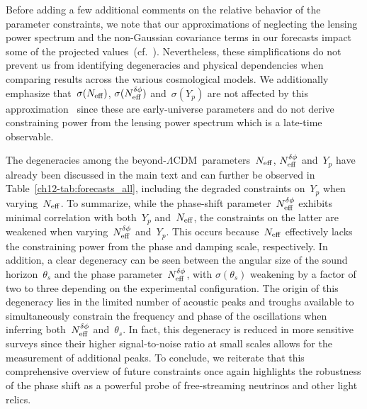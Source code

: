 \begin{subappendices}
Before adding a few additional comments on the relative behavior of the parameter constraints, we note that our approximations of neglecting the lensing power spectrum and the non-Gaussian covariance terms in our forecasts impact some of the projected values~(cf.~\cite{Green:2016cjr}). Nevertheless, these simplifications do not prevent us from identifying degeneracies and physical dependencies when comparing results across the various cosmological models. We additionally emphasize that~$\sigma(N_\mathrm{eff})$, $\sigma(N_\mathrm{eff}^{\delta\phi})$ and~$\sigma(Y_p)$ are not affected by this approximation~\cite{Green:2016cjr} since these are early-universe parameters and do not derive constraining power from the lensing power spectrum which is a late-time observable.

The degeneracies among the beyond-$\Lambda$CDM~parameters~$N_\mathrm{eff}$, $N_\mathrm{eff}^{\delta\phi}$ and~$Y_p$ have already been discussed in the main text and can further be observed in Table~\ref{ch12-tab:forecasts_all}, including the degraded constraints on~$Y_p$ when varying~$N_\mathrm{eff}$. To summarize, while the phase-shift parameter~$N_\mathrm{eff}^{\delta\phi}$ exhibits minimal correlation with both~$Y_p$ and~$N_\mathrm{eff}$, the constraints on the latter are weakened when varying~$N_\mathrm{eff}^{\delta\phi}$ and~$Y_p$. This occurs because~$N_\mathrm{eff}$ effectively lacks the constraining power from the phase and damping scale, respectively. In addition, a clear degeneracy can be seen between the angular size of the sound horizon~$\theta_s$ and the phase parameter~$N_\mathrm{eff}^{\delta\phi}$, with $\sigma(\theta_s)$ weakening by a factor of two to three depending on the experimental configuration. The origin of this degeneracy lies in the limited number of acoustic peaks and troughs available to simultaneously constrain the frequency and phase of the oscillations when inferring both~$N_\mathrm{eff}^{\delta\phi}$ and~$\theta_s$. In fact, this degeneracy is reduced in more sensitive surveys since their higher signal-to-noise ratio at small scales allows for the measurement of additional peaks. To conclude, we reiterate that this comprehensive overview of future constraints once again highlights the robustness of the phase shift as a powerful probe of free-streaming neutrinos and other light relics.






\end{subappendices}
